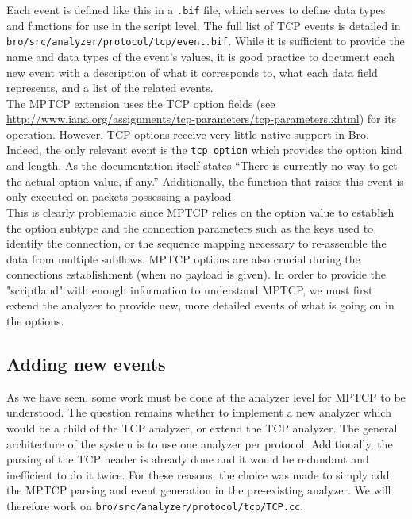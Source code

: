\documentclass[12pt, a4paper, oneside]{article} %
\begin{document}
Each event is defined like this in a \texttt{.bif} file, which serves to define data types and functions for use in the script level. The full list of TCP events is detailed in \\ \texttt{bro/src/analyzer/protocol/tcp/event.bif}. While it is sufficient to provide the name and data types of the event's values, it is good practice to document each new event with a description of what it corresponds to, what each data field represents, and a list of the related events. \\

The MPTCP extension uses the TCP option fields (see \url{http://www.iana.org/assignments/tcp-parameters/tcp-parameters.xhtml}) for its operation. However, TCP options receive very little native support in Bro. Indeed, the only relevant event is the \texttt{tcp\_option} which provides the option kind and length. As the documentation itself states ``There is currently no way to get the actual option value, if any.''  Additionally, the function that raises this event is only executed on packets possessing a payload.\\ 

This is clearly problematic since MPTCP relies on the option value to establish the option subtype and the connection parameters such as the keys used to identify the connection, or the sequence mapping necessary to re-assemble the data from multiple subflows. MPTCP options are also crucial during the connections establishment (when no payload is given). In order to provide the "scriptland" with enough information to understand MPTCP, we must first extend the analyzer to provide new, more detailed events of what is going on in the options.

\subsection{Adding new events}
As we have seen, some work must be done at the analyzer level for MPTCP to be understood. The question remains whether to implement a new analyzer which would be a child of the TCP analyzer, or extend the TCP analyzer. The general architecture of the system is to use one analyzer per protocol. Additionally, the parsing of the TCP header is already done and it would be redundant and inefficient to do it twice. For these reasons, the choice was made to simply add the MPTCP parsing and event generation in the pre-existing analyzer. We will therefore work on \texttt{bro/src/analyzer/protocol/tcp/TCP.cc}.\\
\end{document}
